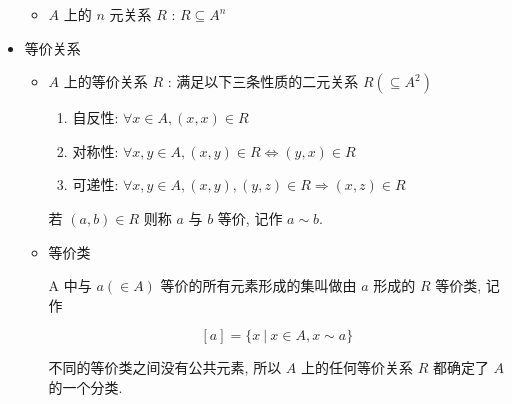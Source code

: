 \documentclass[
    color=black,
    device=normal,
    lang=cn
]{elegantnote}
\begin{document}
\begin{itemize}
\begin{itemize}
              \item $A$ 上的 $n$ 元关系 $R$ : $R\subseteq A^n$
          \end{itemize}
    \item 等价关系
          \begin{itemize}
              \item $A$ 上的等价关系 $R$ : 满足以下三条性质的二元关系 $R(\subseteq A^2)$
                    \begin{enumerate}[label=$\arabic*^\circ$]
                        \item 自反性: $\forall x\in A, (x,x)\in R$
                        \item 对称性: $\forall x,y\in A, (x,y)\in R\Leftrightarrow (y,x)\in R$
                        \item 可递性: $\forall x,y\in A, (x,y), (y,z)\in R\Rightarrow (x,z)\in R$
                    \end{enumerate}
                    若 $(a,b)\in R$ 则称 $a$ 与 $b$ 等价, 记作 $a\sim b$.
              \item 等价类

                    A 中与 $a(\in A)$ 等价的所有元素形成的集叫做由 $a$ 形成的 $R$ 等价类, 记作

                    $$
                        [a] = \{x\ \vert\ x\in A, x\sim a\}
                    $$

                    不同的等价类之间没有公共元素, 所以 $A$ 上的任何等价关系 $R$ 都确定了 $A$ 的一个分类.


\end{itemize}
\end{itemize}
\end{document}
